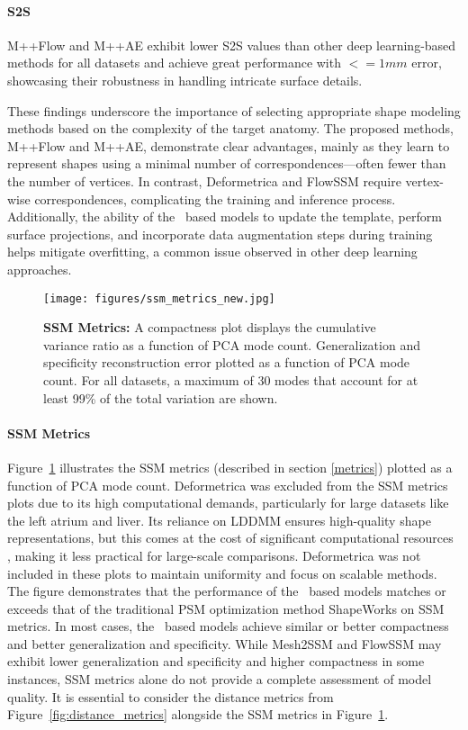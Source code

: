 \paragraph{S2S} M++Flow and M++AE exhibit lower S2S values than other deep learning-based methods for all datasets and achieve great performance with \(<=1 mm\) error, showcasing their robustness in handling intricate surface details.

These findings underscore the importance of selecting appropriate shape modeling methods based on the complexity of the target anatomy. The proposed methods, M++Flow and M++AE, demonstrate clear advantages, mainly as they learn to represent shapes using a minimal number of correspondences—often fewer than the number of vertices. In contrast, Deformetrica and FlowSSM require vertex-wise correspondences, complicating the training and inference process. Additionally, the ability of the \model~based models to update the template, perform surface projections, and incorporate data augmentation steps during training helps mitigate overfitting, a common issue observed in other deep learning approaches.
\begin{figure}
    \centering
    \texttt{[image: figures/ssm\_metrics\_new.jpg]}
    \caption{\textbf{SSM Metrics: }A compactness plot displays the cumulative variance ratio as a function of PCA mode count. Generalization and specificity reconstruction error plotted as a function of PCA mode count. For all datasets, a maximum of 30 modes that account for at least 99\% of the total variation are shown.}
    \label{fig:ssm_metrics}
\end{figure}

\paragraph{SSM Metrics} Figure~\ref{fig:ssm_metrics} illustrates the SSM metrics (described in section \ref{metrics}) plotted as a function of PCA mode count. Deformetrica was excluded from the SSM metrics plots due to its high computational demands, particularly for large datasets like the left atrium and liver. Its reliance on LDDMM \cite{durrleman2009statistical} ensures high-quality shape representations, but this comes at the cost of significant computational resources \cite{bautz2023unsupervised}, making it less practical for large-scale comparisons. Deformetrica was not included in these plots to maintain uniformity and focus on scalable methods. The figure demonstrates that the performance of the \model~based models matches or exceeds that of the traditional PSM optimization method ShapeWorks on SSM metrics.
In most cases, the \model~based models achieve similar or better compactness and better generalization and specificity. While Mesh2SSM and FlowSSM may exhibit lower generalization and specificity and higher compactness in some instances, SSM metrics alone do not provide a complete assessment of model quality. It is essential to consider the distance metrics from Figure~\ref{fig:distance_metrics} alongside the SSM metrics in Figure~\ref{fig:ssm_metrics}.

